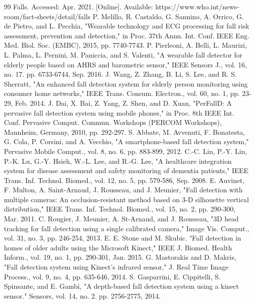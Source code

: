 \documentclass[journal]{IEEEtran}
\begin{document}
\begin{thebibliography}{99}
 Falls. Accessed: Apr. 2021. [Online]. Available: https://www.who.int/news-room/fact-sheets/detail/falls
 P. Melillo, R. Castaldo, G. Sannino, A. Orrico, G. de Pietro, and L. Pecchia, "Wearable technology and ECG processing for fall risk assessment, prevention and detection," in Proc. 37th Annu. Int. Conf. IEEE Eng. Med. Biol. Soc. (EMBC), 2015, pp. 7740-7743.
 P. Pierleoni, A. Belli, L. Maurizi, L. Palma, L. Pernini, M. Paniccia, and S. Valenti, "A wearable fall detector for elderly people based on AHRS and barometric sensor," IEEE Sensors J., vol. 16, no. 17. pp. 6733-6744, Sep. 2016.
 J. Wang, Z. Zhang, B. Li, S. Lee, and R. S. Sherratt, "An enhanced fall detection system for elderly person monitoring using consumer home networks," IEEE Trans. Consum. Electron., vol. 60, no. 1, pp. 23-29, Feb. 2014.
 J. Dai, X. Bai, Z. Yang, Z. Shen, and D. Xuan, "PerFallD: A pervasive fall detection system using mobile phones," in Proc. 8th IEEE Int. Conf. Pervasive Comput. Commun. Workshops (PERCOM Workshops), Mannheim, Germany, 2010, pp. 292-297.
 S. Abbate, M. Avvenuti, F. Bonatesta, G. Cola, P. Corsini, and A. Vecchio, "A smartphone-based fall detection system," Pervasive Mobile Comput., vol. 8, no. 6, pp. 883-899, 2012.
 C.-C. Lin, P.-Y. Lin, P.-K. Lu, G.-Y. Hsieh, W.-L. Lee, and R.-G. Lee, "A healthcare integration system for disease assessment and safety monitoring of dementia patients," IEEE Trans. Inf. Technol. Biomed., vol. 12, no. 5, pp. 579-586, Sep. 2008.
 E. Auvinet, F. Multon, A. Saint-Arnaud, J. Rousseau, and J. Meunier, "Fall detection with multiple cameras: An occlusion-resistant method based on 3-D silhouette vertical distribution," IEEE Trans. Inf. Technol. Biomed., vol. 15, no. 2, pp. 290-300, Mar. 2011.
 C. Rougier, J. Meunier, A. St-Arnaud, and J. Rousseau, "3D head tracking for fall detection using a single calibrated camera," Image Vis. Comput., vol. 31, no. 3, pp. 246-254, 2013.
 E. E. Stone and M. Skubic. "Fall detection in homes of older adults using the Microsoft Kinect," IEEE J. Biomed. Health Inform., vol. 19, no. 1, pp. 290-301, Jan. 2015.
 G. Mastorakis and D. Makris, "Fall detection system using Kinect's infrared sensor," J. Real Time Image Process., vol. 9, no. 4, pp. 635-646, 2014.
 S. Gasparrini, E. Cippitelli, S. Spinsante, and E. Gambi, "A depth-based fall detection system using a kinect sensor." Sensors, vol. 14, no. 2. pp. 2756-2775, 2014.

\end{thebibliography}
\end{document}
